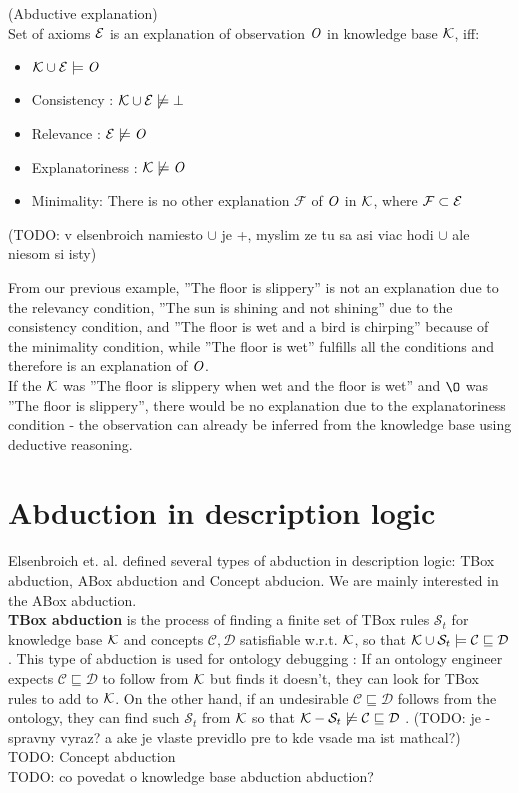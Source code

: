 \begin{mydef} \label{explanation1} (Abductive explanation) \cite{elsenbroich} \\
Set of axioms $\mathcal{E}$ is an explanation of observation $\mathit{O}$ in knowledge base $\mathcal{K}$, iff:
\begin{itemize}
\item $\mathcal{K} \cup \mathcal{E} \models \mathit{O}$
\item Consistency : $\mathcal{K} \cup \mathcal{E} \not\models \bot$
\item Relevance : $\mathcal{E} \not\models \mathit{O}$
\item Explanatoriness : $\mathcal{K} \not\models \mathit{O}$
\item Minimality: There is no other explanation $\mathcal{F}$ of $\mathit{O}$ in $\mathcal{K}$, where $\mathcal{F} \subset \mathcal{E}$
\end{itemize}

(TODO: v elsenbroich namiesto $\cup$ je +, myslim ze tu sa asi viac hodi $\cup$ ale niesom si isty)
\end{mydef}

From our previous example, ''The floor is slippery'' is not an explanation due to the relevancy condition, ''The sun is shining and not shining'' due to the consistency condition, and ''The floor is wet and a bird is chirping'' because of the minimality condition, while ''The floor is wet'' fulfills all the conditions and therefore is an explanation of $\mathit{O}$. \\
If the $\mathcal{K}$ was ''The floor is slippery when wet and the floor is wet'' and $\O$ was ''The floor is slippery'', there would be no explanation due to the explanatoriness condition - the observation can already be inferred from the knowledge base using deductive reasoning.

\section{Abduction in description logic}
Elsenbroich et. al. \cite{elsenbroich} defined several types of abduction in description logic: TBox abduction, ABox abduction and Concept abducion. We are mainly interested in the ABox abduction. \\
\textbf{TBox abduction} is the process of finding a finite set of TBox rules $\mathcal{S}_t$ for knowledge base $\mathcal{K}$ and concepts $\mathcal{C},\mathcal{D}$ satisfiable w.r.t. $\mathcal{K}$, so that $\mathcal{K} \cup \mathcal{S}_t  \models 	\mathcal{C} \sqsubseteq \mathcal{D} $ . This type of abduction is used for ontology debugging : If an ontology engineer expects $\mathcal{C} \sqsubseteq \mathcal{D}$ to follow from $\mathcal{K}$ but finds it doesn't, they can look for TBox rules to add to $\mathcal{K}$. On the other hand, if an undesirable $\mathcal{C} \sqsubseteq \mathcal{D}$ follows from the ontology, they can find such $\mathcal{S}_t$ from $\mathcal{K}$ so that $\mathcal{K} - \mathcal{S}_t \not\models \mathcal{C} \sqsubseteq \mathcal{D}$ . 
(TODO: je - spravny vyraz? a ake je vlaste previdlo pre to kde vsade ma ist mathcal?)
\\
TODO: Concept abduction \\
TODO: co povedat o knowledge base abduction abduction? 

